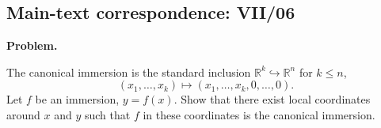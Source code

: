 \subsection*{Main-text correspondence: VII/06}

\begin{problem}
\label{prob:cp-vii-0018}
\par\medskip\noindent\textbf{Problem.}\par\smallskip

The canonical immersion is the standard inclusion $\mathbb{R}^k\hookrightarrow\mathbb{R}^n$ for $k\le n$,
\[
(x_1,\dots,x_k)\longmapsto (x_1,\dots,x_k,0,\dots,0).
\]
Let $f$ be an immersion, $y=f(x)$. Show that there exist local coordinates around $x$ and $y$
such that $f$ in these coordinates is the canonical immersion.
\end{problem}

